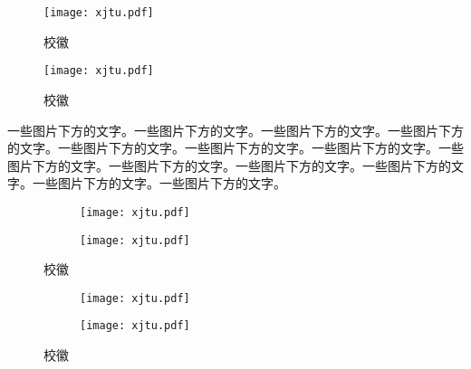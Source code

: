 
\begin{texcodeonly}[]{}
  \begin{figure}[h]
    \centering
    \texttt{[image: xjtu.pdf]}
    \caption{校徽}
  \end{figure}
\end{texcodeonly}

\begin{figure}[h]
  \centering
  \texttt{[image: xjtu.pdf]}
  \caption{校徽}
\end{figure}

一些图片下方的文字。一些图片下方的文字。一些图片下方的文字。一些图片下方的文字。一些图片下方的文字。一些图片下方的文字。一些图片下方的文字。一些图片下方的文字。一些图片下方的文字。一些图片下方的文字。一些图片下方的文字。一些图片下方的文字。一些图片下方的文字。


\begin{texcodeonly}[]{}
  \begin{figure}[h]
    \begin{subfigure}[b]{0.49\linewidth}
        \centering
        \texttt{[image: xjtu.pdf]}
    \end{subfigure}
    \begin{subfigure}[b]{0.49\linewidth}
        \centering
        \texttt{[image: xjtu.pdf]}
        \label{subfigure:icon}
    \end{subfigure}
    \caption{校徽}
    \label{fig:icon}
  \end{figure}
\end{texcodeonly}

\begin{figure}[h]
  \begin{subfigure}[b]{0.49\linewidth}
      \centering
      \texttt{[image: xjtu.pdf]}
  \end{subfigure}
  \begin{subfigure}[b]{0.49\linewidth}
      \centering
      \texttt{[image: xjtu.pdf]}
      \label{subfigure:icon}
  \end{subfigure}
  \caption{校徽}
  \label{figure:icon}
\end{figure}

